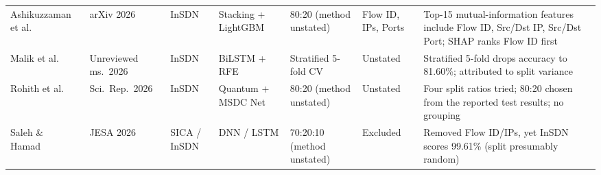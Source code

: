 \begin{table}[t]
{\begin{tabular}{lllllll}
Ashikuzzaman et al.~\cite{ashikuzzaman2026sdnguardstack} & arXiv 2026 & InSDN & Stacking + LightGBM & 80:20 (method unstated) & Flow ID, IPs, Ports & Top-15 mutual-information features include Flow ID, Src/Dst IP, Src/Dst Port; SHAP ranks Flow ID first \\
Malik et al.~\cite{malik2026improving} & Unreviewed ms.\ 2026 & InSDN & BiLSTM + RFE & Stratified 5-fold CV & Unstated & Stratified 5-fold drops accuracy to 81.60\%; attributed to split variance \\
Rohith et al.~\cite{lightids2026} & Sci.\ Rep.\ 2026 & InSDN & Quantum + MSDC Net & 80:20 (method unstated) & Unstated & Four split ratios tried; 80:20 chosen from the reported test results; no grouping \\
Saleh \& Hamad~\cite{saleh2026sica} & JESA 2026 & SICA / InSDN & DNN / LSTM & 70:20:10 (method unstated) & Excluded & Removed Flow ID/IPs, yet InSDN scores 99.61\% (split presumably random) \\
\bottomrule
\end{tabular}}
\end{table}
